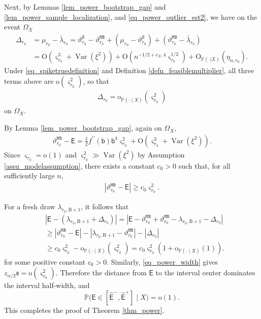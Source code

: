 \documentclass[12pt]{article}
\theoremstyle{plain}
\numberwithin{equation}{section}
\begin{document}
Next, by Lemmas \ref{lem_power_bootstrap_gap} and \ref{lem_power_sample_localization}, and \eqref{eq_power_outlier_est2}, we have on the event $\Omega_X$
\begin{align*}
	\Delta_{r_0}&=\mu_{r_0}-\bar{\lambda}_{r_0}=\vartheta_{r_0}^{\mathtt{S}}-\vartheta_{r_0}^{\mathtt{MB}}+(\mu_{r_0}-\vartheta_{r_0}^{\mathtt{S}})+(\vartheta_{r_0}^{\mathtt{MB}}-\bar{\lambda}_{r_0})\\
	&=\mathrm{O}(\varsigma_{r_0}^3+\operatorname{Var}(\xi^2))+\mathrm{O}(n^{-1/2+c_X,4}\varsigma_{r_0}^{1/2})+\mathrm{O}_{\mathbb{P}(\cdot|X)}(\eta_{n,r_0}).
\end{align*}
Under \eqref{eq_spiketruedefinition} and Definition \ref{defn_feasiblemultiplier}, all three terms above are $\mathrm o(\varsigma_{r_0}^2)$, so that
\begin{align}\label{eq_power_delta_small}
	\Delta_{r_0}=
	\mathrm o_{\mathbb P(\cdot\mid X)}(\varsigma_{r_0}^2)
\end{align}
on $\Omega_X$.

By Lemma \ref{lem_power_bootstrap_gap}, again on $\Omega_X$,
\begin{align*}
	\vartheta_{r_0}^{\mathtt{MB}}-\mathsf E=
	\frac{1}{2} f^{\prime\prime}(\mathsf b)\mathsf b^4\varsigma_{r_0}^2+
	\mathrm O(\varsigma_{r_0}^3+\operatorname{Var}(\xi^2)).
\end{align*}
Since $\varsigma_{r_0}=\mathrm{o}(1)$ and $\varsigma_{r_0}^2\gg \operatorname{Var}(\xi^2)$ by Assumption \ref{assu_modelassumption}, there exists a constant $c_0>0$ such that, for all sufficiently large $n$,
\begin{align}\label{eq_power_center_gap}
	|\vartheta_{r_0}^{\mathtt{MB}}-\mathsf E|
	\ge c_0\varsigma_{r_0}^2.
\end{align}

For a fresh draw $\lambda_{r_0,\mathrm{B}+1}$, it follows that 
\begin{align*}
	&|\mathsf{E}-(\lambda_{r_0,\mathrm{B}+1}+\Delta_{r_0})|=|\mathsf{E}-\vartheta_{r_0}^{\mathtt{MB}}+\vartheta_{r_0}^{\mathtt{MB}}-\lambda_{r_0,\mathrm{B}+1}-\Delta_{r_0}|\\
	&\ge |\vartheta_{r_0}^{\mathtt{MB}}-\mathsf{E}|
	-|\lambda_{r_0,\mathrm{B}+1}-\vartheta_{r_0}^{\mathtt{MB}}|
	-|\Delta_{r_0}|\\
	&\ge c_0\varsigma_{r_0}^2-
	\mathrm{o}_{\mathbb P(\cdot\mid X)}(\varsigma_{r_0}^2)=
	c_0\varsigma_{r_0}^2(1+\mathrm o_{\mathbb P(\cdot\mid X)}(1)).
\end{align*}
for some positive constant $c_0>0$. Similarly, \eqref{eq_power_width} gives $z_{\alpha/2}\mathfrak{s}=\mathrm{o}(\varsigma_{r_0}^2).$
Therefore the distance from $\mathsf E$ to the interval center dominates the interval half-width, and
\[
\mathbb P\big(\mathsf E\in[\widehat{\mathsf E}^-,\widehat{\mathsf E}^+]\mid X\big)=\mathrm{o}(1).
\]
This completes the proof of Theorem \ref{thm_power}.
\end{document}
